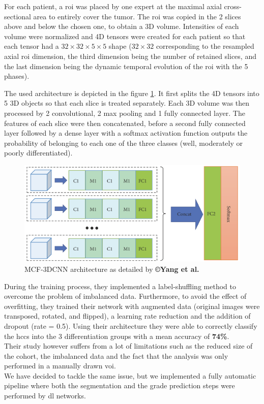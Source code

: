 \documentclass[]{article}
\begin{document}
For each patient, a \ac{roi} was placed by one expert at the maximal axial
cross-sectional area to entirely cover the tumor. The \ac{roi} was
copied in the 2 slices above and below the chosen one, to obtain a 3D
volume. Intensities of each volume were normalized and 4D tensors were
created for each patient so that each tensor had a $ 32\times32\times5\times5 $ shape
($ 32\times32 $ corresponding to the resampled axial \ac{roi} dimension, the third
dimension being the number of retained slices, and the last dimension being the
dynamic temporal evolution of the \ac{roi} with the 5 phases).

The used architecture is depicted in the figure \ref{fig:Yang2019_Figure2_MCF-3DCNN}. It first splits the 4D
tensors into 5 3D objects so that each slice is treated separately. Each
3D volume was then processed by 2 convolutional, 2 max pooling and 1
fully connected layer. The features of each slice were then
concatenated, before a second fully connected layer followed by a dense
layer with a softmax activation function outputs the probability of
belonging to each one of the three classes (well, moderately or poorly differentiated).

\begin{figure}[th!]
	\centering
	\includegraphics[width=0.7\linewidth]{images/Yang2019_Fig2}
	\caption{MCF-3DCNN architecture as detailed by \textbf{©Yang et al. \cite{Yang2019}}}
	\label{fig:Yang2019_Figure2_MCF-3DCNN}
\end{figure}


During the training process, they implemented a label-shuffling method
to overcome the problem of imbalanced data. Furthermore, to avoid the
effect of overfitting, they trained their network with augmented data
(original images were transposed, rotated, and flipped), a learning rate
reduction and the addition of dropout (rate = 0.5).
Using their architecture they were able to correctly classify the \ac{hcc}s
into the 3 differentiation groups with a mean accuracy of \textbf{74\%}.\\
Their study however suffers from a lot of limitations such as the
reduced size of the cohort, the imbalanced data and the fact that the
analysis was only performed in a manually drawn \ac{voi}.\\
We have decided to tackle the same issue, but we implemented a fully
automatic pipeline where both the segmentation and the grade prediction
steps were performed by \ac{dl} networks.
\end{document}

